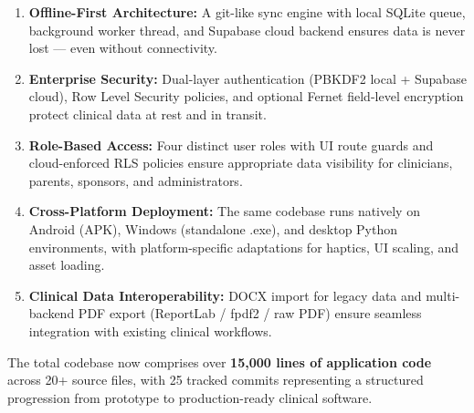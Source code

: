 \documentclass[12pt,a4paper]{article}
\begin{document}
\begin{enumerate}[leftmargin=2em]
    \item \textbf{Offline-First Architecture:} A git-like sync engine with local SQLite queue, background worker thread, and Supabase cloud backend ensures data is never lost — even without connectivity.
    \item \textbf{Enterprise Security:} Dual-layer authentication (PBKDF2 local + Supabase cloud), Row Level Security policies, and optional Fernet field-level encryption protect clinical data at rest and in transit.
    \item \textbf{Role-Based Access:} Four distinct user roles with UI route guards and cloud-enforced RLS policies ensure appropriate data visibility for clinicians, parents, sponsors, and administrators.
    \item \textbf{Cross-Platform Deployment:} The same codebase runs natively on Android (APK), Windows (standalone .exe), and desktop Python environments, with platform-specific adaptations for haptics, UI scaling, and asset loading.
    \item \textbf{Clinical Data Interoperability:} DOCX import for legacy data and multi-backend PDF export (ReportLab / fpdf2 / raw PDF) ensure seamless integration with existing clinical workflows.
\end{enumerate}

The total codebase now comprises over \textbf{15,000 lines of application code} across 20+ source files, with 25 tracked commits representing a structured progression from prototype to production-ready clinical software.

\end{document}
